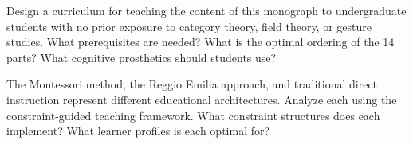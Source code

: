 \begin{exercise}
  Design a curriculum for teaching the content of this monograph
  to undergraduate students with no prior exposure to category
  theory, field theory, or gesture studies. What prerequisites
  are needed? What is the optimal ordering of the 14 parts?
  What cognitive prosthetics should students use?
\end{exercise}

\begin{exercise}
  The Montessori method, the Reggio Emilia approach, and traditional
  direct instruction represent different educational architectures.
  Analyze each using the constraint-guided teaching framework.
  What constraint structures does each implement? What learner
  profiles is each optimal for?
\end{exercise}
